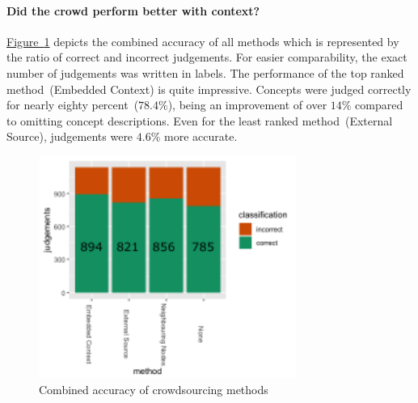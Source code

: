 \paragraph{Did the crowd perform better with context?}
\hyperref[fig:results_accuracy_combined]{Figure~\ref*{fig:results_accuracy_combined}} depicts the combined accuracy of all methods which is represented
by the ratio of correct and incorrect judgements. For easier comparability, the exact number of judgements was written in labels. The performance of the top ranked method~(Embedded Context) is quite impressive. Concepts were judged correctly for nearly eighty percent~($78.4\%$), being an improvement of over $14\%$ compared to omitting concept descriptions. Even for the least ranked method~(External Source), judgements were $4.6\%$ more accurate.   
\begin{figure}
	 \centering
	 \includegraphics[width=0.75\textwidth]{plots/comparison/barplot_all_judgements}
	 \caption{Combined accuracy of crowdsourcing methods}\label{fig:results_accuracy_combined}
\end{figure}


